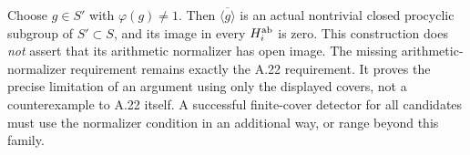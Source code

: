 Choose $g\in S'$ with $\varphi(g)\ne1$. Then $\overline{\langle g\rangle}$ is an actual nontrivial closed procyclic subgroup of $S'\subset S$, and its image in every $H_i^{\rm ab}$ is zero. This construction does \emph{not} assert that its arithmetic normalizer has open image. The missing arithmetic-normalizer requirement remains exactly the A.22 requirement. It proves the precise limitation of an argument using only the displayed covers, not a counterexample to A.22 itself. A successful finite-cover detector for all candidates must use the normalizer condition in an additional way, or range beyond this family.

